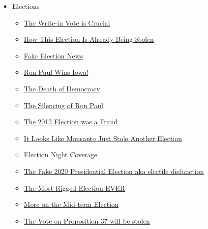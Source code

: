 \documentclass{article}
\newcommand{\insertmydocument}[2]{ %
  \item \href{http://www.mileswmathis.com/#2}{#1}
}
\begin{document}
\begin{itemize}
\begin{itemize}
    \item Elections
    \begin{itemize}

      \insertmydocument{The Write-in Vote is Crucial}{writein2.pdf}
      \insertmydocument{How This Election Is Already Being Stolen}{paul.pdf}
      \insertmydocument{Fake Election News}{paul2.pdf}
      \insertmydocument{Ron Paul Wins Iowa!}{paul3.pdf}
      \insertmydocument{The Death of Democracy}{paul4.pdf}
      \insertmydocument{The Silencing of Ron Paul}{paul5.pdf}
      \insertmydocument{The 2012 Election was a Fraud}{vote.pdf}
      \insertmydocument{It Looks Like Monsanto Just Stole Another Election}{bronner.pdf}
      \insertmydocument{Election Night Coverage}{trump2.pdf}
      \insertmydocument{The Fake 2020 Presidential Election aka electile disfunction}{trump3.pdf}
      \insertmydocument{The Most Rigged Election EVER}{2022.pdf}
      \insertmydocument{More on the Mid-term Election}{sbf.pdf}
      \insertmydocument{The Vote on Proposition 37 will be stolen}{37.pdf}
    \end{itemize}
  \end{itemize}
\end{itemize}
\end{document}
